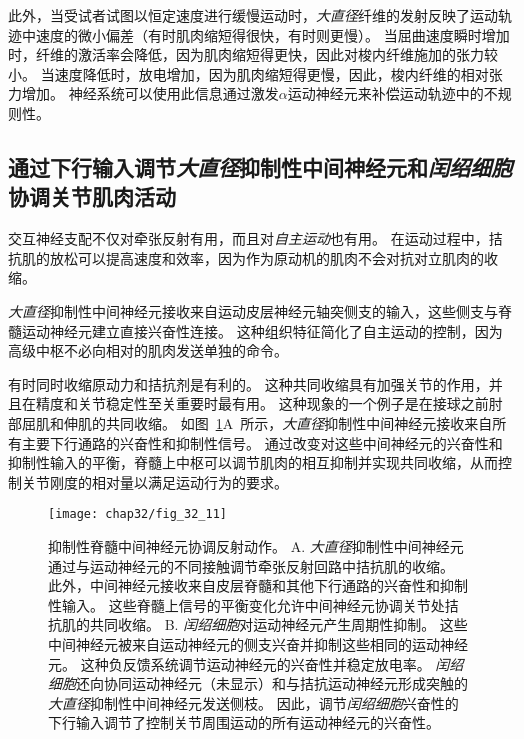 此外，当受试者试图以恒定速度进行缓慢运动时，\textit{大直径}纤维的发射反映了运动轨迹中速度的微小偏差（有时肌肉缩短得很快，有时则更慢）。
当屈曲速度瞬时增加时，纤维的激活率会降低，因为肌肉缩短得更快，因此对梭内纤维施加的张力较小。
当速度降低时，放电增加，因为肌肉缩短得更慢，因此，梭内纤维的相对张力增加。
神经系统可以使用此信息通过激发$ \alpha $运动神经元来补偿运动轨迹中的不规则性。



\subsection{通过下行输入调节\textit{大直径}抑制性中间神经元和\textit{闰绍细胞}协调关节肌肉活动}

交互神经支配不仅对牵张反射有用，而且对\textit{自主运动}也有用。
在运动过程中，拮抗肌的放松可以提高速度和效率，因为作为原动机的肌肉不会对抗对立肌肉的收缩。


\textit{大直径}抑制性中间神经元接收来自运动皮层神经元轴突侧支的输入，这些侧支与脊髓运动神经元建立直接兴奋性连接。
这种组织特征简化了自主运动的控制，因为高级中枢不必向相对的肌肉发送单独的命令。


有时同时收缩原动力和拮抗剂是有利的。
这种共同收缩具有加强关节的作用，并且在精度和关节稳定性至关重要时最有用。
这种现象的一个例子是在接球之前肘部屈肌和伸肌的共同收缩。
如图~\ref{fig:32_11}A~所示，\textit{大直径}抑制性中间神经元接收来自所有主要下行通路的兴奋性和抑制性信号。
通过改变对这些中间神经元的兴奋性和抑制性输入的平衡，脊髓上中枢可以调节肌肉的相互抑制并实现共同收缩，从而控制关节刚度的相对量以满足运动行为的要求。



\begin{figure}[htbp]
	\centering
	\texttt{[image: chap32/fig\_32\_11]}
	\caption{抑制性脊髓中间神经元协调反射动作。
	A. \textit{大直径}抑制性中间神经元通过与运动神经元的不同接触调节牵张反射回路中拮抗肌的收缩。
	此外，中间神经元接收来自皮层脊髓和其他下行通路的兴奋性和抑制性输入。
	这些脊髓上信号的平衡变化允许中间神经元协调关节处拮抗肌的共同收缩。
	B. \textit{闰绍细胞}对运动神经元产生周期性抑制。
	这些中间神经元被来自运动神经元的侧支兴奋并抑制这些相同的运动神经元。
	这种负反馈系统调节运动神经元的兴奋性并稳定放电率。
	\textit{闰绍细胞}还向协同运动神经元（未显示）和与拮抗运动神经元形成突触的\textit{大直径}抑制性中间神经元发送侧枝。
	因此，调节\textit{闰绍细胞}兴奋性的下行输入调节了控制关节周围运动的所有运动神经元的兴奋性。}
	\label{fig:32_11}
\end{figure}


